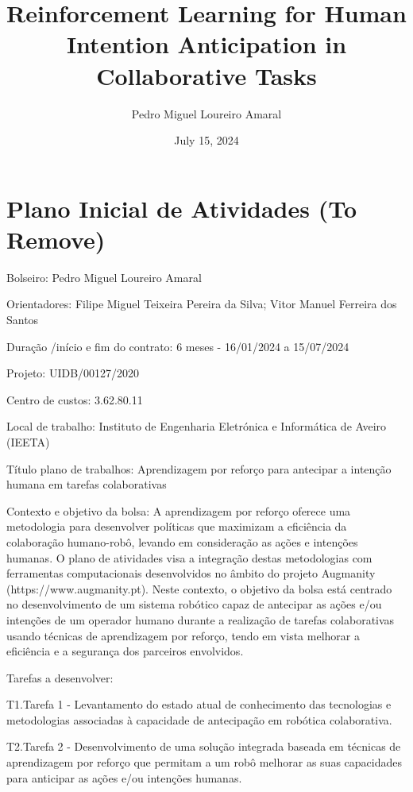 \documentclass[a4paper]{report}
\title{Reinforcement Learning for Human Intention Anticipation in Collaborative Tasks}
\author{Pedro Miguel Loureiro Amaral}
\date{July 15, 2024}
\begin{document}
\maketitle

\renewcommand\thesection{\arabic{section}}








\color{red}

\section{Plano Inicial de Atividades (To Remove)}

Bolseiro: Pedro Miguel Loureiro Amaral

Orientadores: Filipe Miguel Teixeira Pereira da Silva; Vitor Manuel Ferreira dos Santos

Duração /início e fim do contrato: 6 meses - 16/01/2024 a 15/07/2024

Projeto: UIDB/00127/2020

Centro de custos: 3.62.80.11

Local de trabalho: Instituto de Engenharia Eletrónica e Informática de Aveiro (IEETA)

Título plano de trabalhos: Aprendizagem por reforço para antecipar a intenção humana em tarefas colaborativas

Contexto e objetivo da bolsa: A aprendizagem por reforço oferece uma metodologia para desenvolver políticas que maximizam a eficiência da colaboração humano-robô, levando em consideração as ações e intenções humanas. O plano de atividades visa a integração destas metodologias com ferramentas computacionais desenvolvidos no âmbito do projeto Augmanity (https://www.augmanity.pt). Neste contexto, o objetivo da bolsa está centrado no desenvolvimento de um sistema robótico capaz de antecipar as ações e/ou intenções de um operador humano durante a realização de tarefas colaborativas usando técnicas de aprendizagem por reforço, tendo em vista melhorar a eficiência e a segurança dos parceiros envolvidos.

Tarefas a desenvolver:

T1.Tarefa 1 - Levantamento do estado atual de conhecimento das tecnologias e metodologias associadas à capacidade de antecipação em robótica colaborativa.

T2.Tarefa 2 - Desenvolvimento de uma solução integrada baseada em técnicas de aprendizagem por reforço que permitam a um robô melhorar as suas capacidades para anticipar as ações e/ou intenções humanas.
\end{document}
